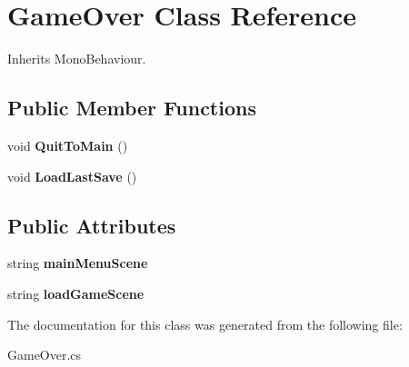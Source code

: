\hypertarget{class_game_over}{}\section{Game\+Over Class Reference}
\label{class_game_over}


Inherits Mono\+Behaviour.

\subsection*{Public Member Functions}
\begin{DoxyCompactItemize}
\item 
\mbox{\label{class_game_over_a84caf457ec08346d1ab76857475ccdda}} 
void {\bfseries Quit\+To\+Main} ()
\item 
\mbox{\label{class_game_over_a307a6eca40570530f6f07ea7ce78aba9}} 
void {\bfseries Load\+Last\+Save} ()
\end{DoxyCompactItemize}
\subsection*{Public Attributes}
\begin{DoxyCompactItemize}
\item 
\mbox{\label{class_game_over_aac506487ebec15e09fac5fa458dc4ba4}} 
string {\bfseries main\+Menu\+Scene}
\item 
\mbox{\label{class_game_over_af1855668f72825a5fcf43c284202b5a4}} 
string {\bfseries load\+Game\+Scene}
\end{DoxyCompactItemize}


The documentation for this class was generated from the following file\+:\begin{DoxyCompactItemize}
\item 
Game\+Over.\+cs\end{DoxyCompactItemize}

